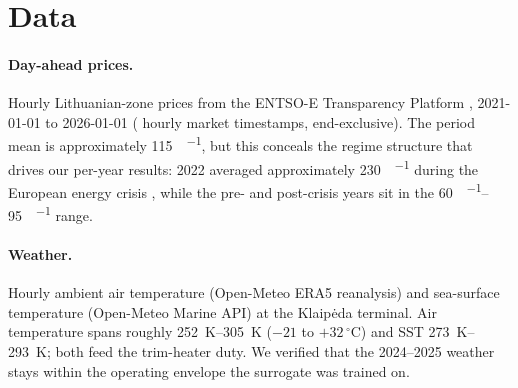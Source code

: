 \documentclass[11pt]{article}
\begin{document}
\section{Data}
\label{sec:data}

%
%
%

\paragraph{Day-ahead prices.} Hourly Lithuanian-zone prices from the ENTSO-E
Transparency Platform \citep{entsoe2023}, 2021-01-01 to 2026-01-01
(\lngRecordCountMarketHours{} hourly market timestamps, end-exclusive). The period mean
is approximately \SI{115}{\eur\per\MWh}, but this conceals the regime structure that
drives our per-year results: 2022 averaged approximately \SI{230}{\eur\per\MWh}
during the European energy crisis \citep{eu2022crisis}, while the pre- and
post-crisis years sit in the \SIrange{60}{95}{\eur\per\MWh} range.

\paragraph{Weather.} Hourly ambient air temperature (Open-Meteo ERA5
reanalysis) and sea-surface temperature (Open-Meteo Marine API)
\citep{openmeteo} at the Klaip\.eda terminal. Air temperature spans roughly
\SIrange{252}{305}{\kelvin} ($-21$ to $+32\,^\circ$C) and SST
\SIrange{273}{293}{\kelvin}; both feed the trim-heater duty. We verified that
the 2024--2025 weather stays within the operating envelope the surrogate was
trained on.
\end{document}
